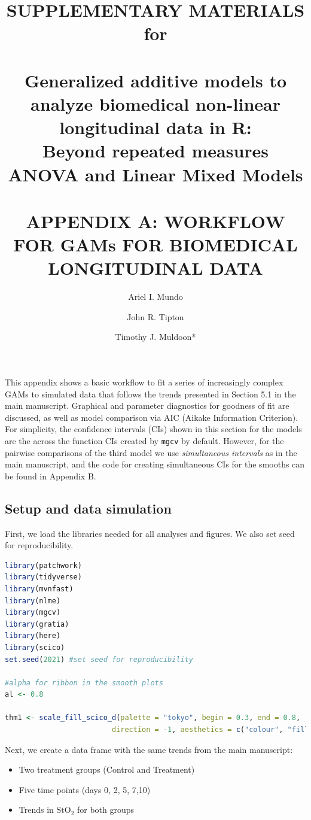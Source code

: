 \documentclass[
]{article}
\author{Ariel I. Mundo \orcidaffila{}}
\author{John R. Tipton \orcidaffilb{}}
\author{Timothy J. Muldoon*}
\affil{tmuldoon@uark.edu}
\title{SUPPLEMENTARY MATERIALS for\\
~\\
\textbf{Generalized additive models to analyze biomedical non-linear longitudinal data in R:}\\
Beyond repeated measures ANOVA and Linear Mixed Models\\
~\\
APPENDIX A: WORKFLOW FOR GAMs FOR BIOMEDICAL LONGITUDINAL DATA}
\author{}
\date{\vspace{-2.5em}}
\newcommand{\passthrough}[1]{#1}
\providecommand{\tightlist}{%
  \setlength{\itemsep}{0pt}\setlength{\parskip}{0pt}}
\begin{document}
\maketitle

\newpage


This appendix shows a basic workflow to fit a series of increasingly complex GAMs to simulated data that follows the trends presented in Section 5.1 in the main manuscript. Graphical and parameter diagnostics for goodness of fit are discussed, as well as model comparison via AIC (Aikake Information Criterion). For simplicity, the confidence intervals (CIs) shown in this section for the models are the across the function CIs created by \passthrough{\lstinline!mgcv!} by default. However, for the pairwise comparisons of the third model we use \emph{simultaneous intervals} as in the main manuscript, and the code for creating simultaneous CIs for the smooths can be found in Appendix B.

\hypertarget{setup-and-data-simulation}{%
\subsection{Setup and data simulation}\label{setup-and-data-simulation}}

First, we load the libraries needed for all analyses and figures. We also set seed for reproducibility.

\begin{lstlisting}[language=R]
library(patchwork)
library(tidyverse)
library(mvnfast)
library(nlme)
library(mgcv)
library(gratia)
library(here)
library(scico)
set.seed(2021) #set seed for reproducibility

#alpha for ribbon in the smooth plots
al <- 0.8

thm1 <- scale_fill_scico_d(palette = "tokyo", begin = 0.3, end = 0.8,
                         direction = -1, aesthetics = c("colour", "fill"))
\end{lstlisting}

Next, we create a data frame with the same trends from the main manuscript:

\begin{itemize}
\tightlist
\item
  Two treatment groups (Control and Treatment)
\item
  Five time points (days 0, 2, 5, 7,10)
\item
  Trends in \(\mbox{StO}_2\) for both groups
\end{itemize}
\end{document}
